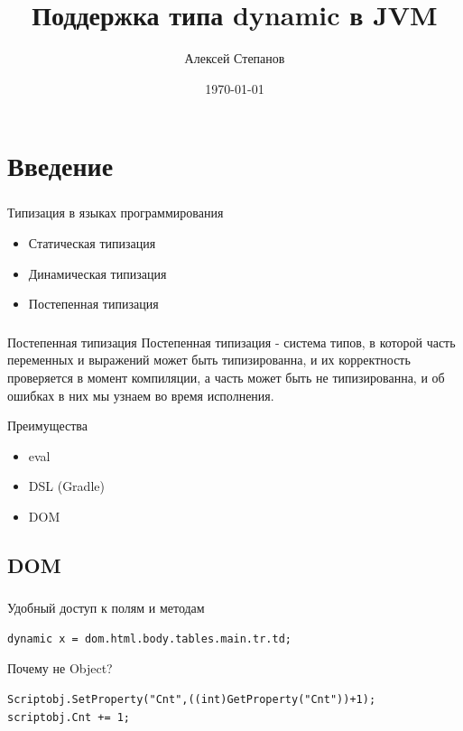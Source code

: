 \documentclass[t]{beamer}  %
\title{Поддержка типа dynamic в JVM}
\author{Алексей Степанов}
\date{\today}
\institute[СПб АУ НОЦНТ РАН]{Научный руководитель:  Андрей Бреслав \\
    \vspace{0.7cm}
    САНКТ-ПЕТЕРБУРГСКИЙ АКАДЕМИЧЕСКИЙ УНИВЕРСИТЕТ \\
    \vspace{0.7cm}
}
\begin{document}
\frame[plain]{\titlepage}	%

\section{Введение}
 
\begin{frame}
	\frametitle{\insertsection} 
    Типизация в языках программирования
	\begin{itemize}
    	\item Статическая типизация
       	\item Динамическая типизация
        \item Постепенная типизация
	\end{itemize}    
\end{frame}

\begin{frame}
	\frametitle{\insertsection} 
	\begin{block}{Постепенная типизация}
		Постепенная типизация - система типов, в которой часть переменных и выражений может быть типизированна, и их корректность 					проверяется в момент компиляции, а часть может быть не типизированна, и об ошибках в них мы узнаем во время исполнения.
	\end{block}

	\begin{block}{Преимущества}
		\begin{itemize}
	    	\item eval
	        \item DSL (Gradle)
   	       	\item DOM
		\end{itemize}    
    \end{block}
\end{frame}

\subsection{DOM}

\begin{frame}[fragile]
	\frametitle{\insertsection} 
    \framesubtitle{\insertsubsection}
	\begin{block}{Удобный доступ к полям и методам}
	\begin{verbatim}
dynamic x = dom.html.body.tables.main.tr.td;
	\end{verbatim}
    \end{block}
    
    \begin{block}{Почему не Object?}
    \begin{verbatim}
Scriptobj.SetProperty("Cnt",((int)GetProperty("Cnt"))+1);
scriptobj.Cnt += 1;
	\end{verbatim}
    \end{block}
\end{frame}
\end{document}
